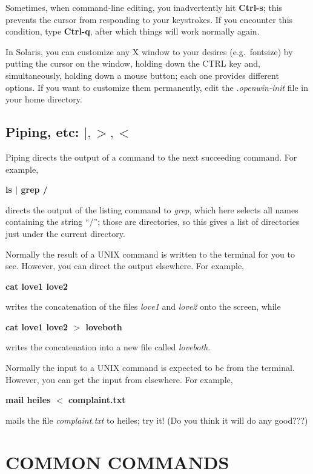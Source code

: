 \noindent Sometimes, when command-line editing, you inadvertently hit
{\bf Ctrl-s}; this prevents the cursor from responding to your
keystrokes. If you encounter this condition, type {\bf Ctrl-q}, after
which things will work normally again.

	In Solaris, you can customize any X window to your desires
(e.g.\ fontsize) by putting the cursor on the window, holding down the
CTRL key and, simultaneously, holding down a mouse button; each one
provides different options.  If you want to customize them permanently,
edit the {\it .openwin-init} file in your home directory. 

\subsection{Piping, etc: $|, >, <$}\label{help}

	Piping directs the output of a command to the next succeeding
command.  For example,

\noindent \textbf{ ls $|$ grep /}

\noindent directs the output of the listing command to {\it grep}, which
here selects all names containing the string ``/''; those are
directories, so this gives a list of directories just under the current
directory. 

	Normally the result of a UNIX command is written to the terminal
for you to see. However, you can direct the output elsewhere. For
example, 

\noindent \textbf{ cat love1 love2}

\noindent writes the concatenation of the files {\it love1} and {\it
love2} onto the screen, while

\noindent \textbf{ cat love1 love2 $>$ loveboth}

\noindent writes the concatenation into a new file called {\it
loveboth}.

	Normally the input to a UNIX command is expected to be from the
terminal. However, you can get the input from elsewhere. For example, 

\noindent \textbf{ mail heiles $<$ complaint.txt}

\noindent mails the file {\it complaint.txt} to heiles; try it! (Do you
think it will do any good???)

\eject

\section{COMMON COMMANDS}\label{commands}

